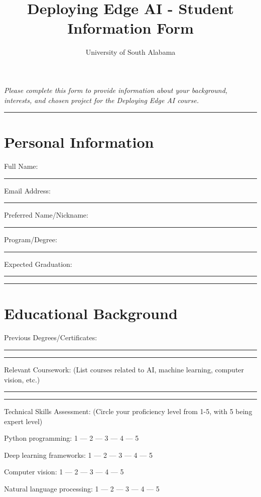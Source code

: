 \documentclass[11pt]{article}
\title{Deploying Edge AI - Student Information Form} \author{University of South Alabama}
\begin{document}
	
	\maketitle
	
	\begin{center} \textit{Please complete this form to provide information about your background, interests, and chosen project for the Deploying Edge AI course.} \end{center}
	
	\noindent\rule{\textwidth}{0.4pt}
	
	\section{Personal Information}
	
	\noindent Full Name: \rule{10cm}{0.4pt}
	
	\noindent Email Address: \rule{10cm}{0.4pt}
	
	\noindent Preferred Name/Nickname: \rule{10cm}{0.4pt}
	
	\noindent Program/Degree: \rule{10cm}{0.4pt}
	
	\noindent Expected Graduation: \rule{10cm}{0.4pt}
	
	\noindent\rule{\textwidth}{0.4pt}
	
	\section{Educational Background}
	
	\noindent Previous Degrees/Certificates:
	
	\noindent\rule{\textwidth}{0.4pt}
	
	\noindent\rule{\textwidth}{0.4pt}
	
	\noindent Relevant Coursework: (List courses related to AI, machine learning, computer vision, etc.)
	
	\noindent\rule{\textwidth}{0.4pt}
	
	\noindent\rule{\textwidth}{0.4pt}
	
	\noindent Technical Skills Assessment: (Circle your proficiency level from 1-5, with 5 being expert level)
	
	\noindent Python programming: 1 --- 2 --- 3 --- 4 --- 5
	
	\noindent Deep learning frameworks: 1 --- 2 --- 3 --- 4 --- 5
	
	\noindent Computer vision: 1 --- 2 --- 3 --- 4 --- 5
	
	\noindent Natural language processing: 1 --- 2 --- 3 --- 4 --- 5
	
\end{document}
